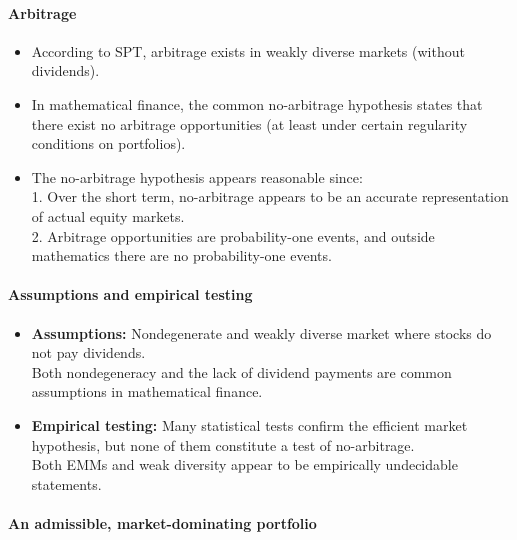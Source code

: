 \documentclass[a4paper,landscape,8pt,fleqn]{scrartcl}
\renewcommand{\emph}[1]{\textbf{#1}}
\begin{document}
\begin{multicols*}{3}
\paragraph{Arbitrage}

\begin{itemize}
\item According to SPT, arbitrage exists in weakly diverse markets (without dividends).
\item In mathematical finance, the common no-arbitrage hypothesis states that there exist no arbitrage opportunities (at least under certain regularity conditions on portfolios).
\item The no-arbitrage hypothesis appears reasonable since: \\
1. Over the short term, no-arbitrage appears to be an accurate representation of actual equity markets. \\
2. Arbitrage opportunities are probability-one events, and outside mathematics there are no probability-one events.
\end{itemize}

\paragraph{Assumptions and empirical testing}

\begin{itemize}
\item \emph{Assumptions:} Nondegenerate and weakly diverse market where stocks do not pay dividends. \\
Both nondegeneracy and the lack of dividend payments are common assumptions in mathematical finance.
\item \emph{Empirical testing:} Many statistical tests confirm the efficient market hypothesis, but none of them constitute a test of no-arbitrage. \\
Both EMMs and weak diversity appear to be empirically undecidable statements.
\end{itemize}

\paragraph{An admissible, market-dominating portfolio}


\end{multicols*}
\end{document}
